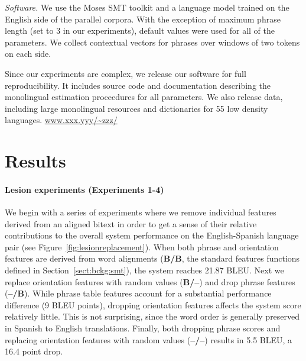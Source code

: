 \documentclass[11pt]{article}
\newcommand{\secref}[1]{Section~\ref{#1}}
\newcommand{\figref}[1]{Figure~\ref{#1}}
\newcommand{\paraheader}[1]{\vskip 0.05in \noindent\emph{#1}}
\begin{document}
\paraheader{Software.} We use the Moses SMT toolkit \cite{Moses} and a language model trained on the English side of the parallel corpora.  With the exception of maximum phrase length (set to 3 in our experiments), default values were used for all of the parameters.  We collect contextual vectors for phrases over windows of two tokens on each side. %

Since our experiments are complex, we release our software for full reproducibility.  It includes source code and documentation describing the monolingual estimation proceedures for all parameters. We also release data, including large monolingual resources and dictionaries for 55 low density languages. \url{www.xxx.yyy/~zzz/}



\section{Results} \label{sect:results}

\paragraph{Lesion experiments (Experiments 1-4)}  \label{sect:exp:lesions}

We begin with a series of experiments where we remove individual features derived from an aligned bitext in order to get a sense of their relative contributions to the overall system performance on the English-Spanish language pair (see \figref{fig:lesionreplacement}). When both phrase and orientation features are derived from word alignments ({\bf B/B}, the standard features functions defined in \secref{sect:bckg:smt}), the system reaches 21.87 BLEU.  Next we replace orientation features with random values ({\bf B/--}) and drop phrase features ({\bf --/B}).  While phrase table features account for a substantial performance difference (9 BLEU points), dropping orientation features affects the system score relatively little.  This is not surprising, since the word order is generally preserved in Spanish to English translations.  Finally, both dropping phrase scores and replacing orientation features with random values ({\bf --/--}) results in 5.5 BLEU, a 16.4 point drop.
\end{document}
